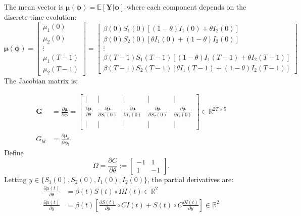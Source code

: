 The mean vector is $\boldsymbol{\mu}(\boldsymbol{\phi}) =
\mathbb{E}[\mathbf{Y}|\boldsymbol{\phi}]$ where each component depends
on the discrete-time evolution:
\begin{equation}
\boldsymbol{\mu}(\boldsymbol{\phi}) = \begin{bmatrix} 
\mu_1(0) \\ \mu_2(0) \\ \vdots \\ \mu_1(T-1) \\ \mu_2(T-1) 
\end{bmatrix} = \begin{bmatrix}
\beta(0) S_1(0)[(1-\theta) I_1(0) + \theta I_2(0)] \\
\beta(0) S_2(0)[\theta I_1(0) + (1-\theta) I_2(0)] \\
\vdots \\
\beta(T-1) S_1(T-1)[(1-\theta) I_1(T-1) + \theta I_2(T-1)] \\
\beta(T-1) S_2(T-1)[\theta I_1(T-1) + (1-\theta) I_2(T-1)]
\end{bmatrix}
\end{equation} The Jacobian matrix is:

\begin{align}
  \mathbf{G} &= \frac{\partial \boldsymbol{\mu}}{\partial \boldsymbol{\phi}} =
  \begin{bmatrix}
    |& |& |& |& |\\
    \frac{\partial \boldsymbol{\mu}}{\partial \theta} & 
    \frac{\partial \boldsymbol{\mu}}{\partial S_1(0)} & 
    \frac{\partial \boldsymbol{\mu}}{\partial I_1(0)} & 
    \frac{\partial \boldsymbol{\mu}}{\partial S_2(0)} & 
    \frac{\partial \boldsymbol{\mu}}{\partial I_2(0)}
    \\|& |& |& |& |
  \end{bmatrix} \in \mathbb{R}^{2T \times 5}\\
  G_{kl} &= \frac{\partial \boldsymbol{\mu}_k}{\partial \boldsymbol{\phi}_l}
\end{align}
Define
\begin{equation}
  \Omega = \frac{\partial C}{\partial \theta} :=
  \begin{bmatrix} -1 & 1 \\ 1 & -1 \end{bmatrix}.
\end{equation}
Letting $y \in \{S_1(0), S_2(0), I_1(0), I_2(0)\}$, the partial
derivatives are:
\begin{align}
\frac{\partial \mu(t)}{\partial \theta} &= \beta(t) S(t) \circ \Omega I(t) \in \mathbb{R}^2 \\
\frac{\partial \mu(t)}{\partial y} &= \beta(t)\left [ \frac{\partial S(t)}{\partial y} \circ C I(t) + S(t) \circ C \frac{\partial I(t)}{\partial y}\right ] \in \mathbb{R}^2
\end{align}

